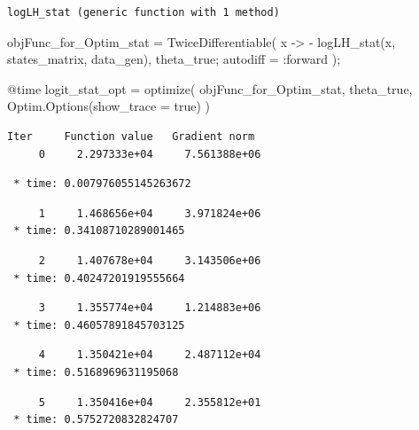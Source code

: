 \documentclass[
  letterpaper,
  DIV=11,
  numbers=noendperiod]{scrreprt}
\newenvironment{Shaded}{\begin{snugshade}}{\end{snugshade}}
\newcommand{\ConstantTok}[1]{\textcolor[rgb]{0.56,0.35,0.01}{#1}}
\newcommand{\FunctionTok}[1]{\textcolor[rgb]{0.28,0.35,0.67}{#1}}
\newcommand{\NormalTok}[1]{\textcolor[rgb]{0.00,0.23,0.31}{#1}}
\newcommand{\OperatorTok}[1]{\textcolor[rgb]{0.37,0.37,0.37}{#1}}
\newcommand{\PreprocessorTok}[1]{\textcolor[rgb]{0.68,0.00,0.00}{#1}}
\begin{document}
\begin{verbatim}
logLH_stat (generic function with 1 method)
\end{verbatim}

\begin{Shaded}
\begin{Highlighting}[]
\NormalTok{objFunc\_for\_Optim\_stat }\OperatorTok{=} \FunctionTok{TwiceDifferentiable}\NormalTok{(}
\NormalTok{    x }\OperatorTok{{-}\textgreater{}} \OperatorTok{{-}} \FunctionTok{logLH\_stat}\NormalTok{(x, states\_matrix, data\_gen),}
\NormalTok{    theta\_true;}
\NormalTok{    autodiff }\OperatorTok{=} \OperatorTok{:}\NormalTok{forward}
\NormalTok{    );}

\PreprocessorTok{@time}\NormalTok{ logit\_stat\_opt }\OperatorTok{=} \FunctionTok{optimize}\NormalTok{(}
\NormalTok{    objFunc\_for\_Optim\_stat,}
\NormalTok{    theta\_true,}
\NormalTok{    Optim.}\FunctionTok{Options}\NormalTok{(show\_trace }\OperatorTok{=} \ConstantTok{true}\NormalTok{)}
\NormalTok{)}
\end{Highlighting}
\end{Shaded}

\begin{verbatim}
Iter     Function value   Gradient norm 
     0     2.297333e+04     7.561388e+06
\end{verbatim}

\begin{verbatim}
 * time: 0.007976055145263672
\end{verbatim}

\begin{verbatim}
     1     1.468656e+04     3.971824e+06
 * time: 0.34108710289001465
\end{verbatim}

\begin{verbatim}
     2     1.407678e+04     3.143506e+06
 * time: 0.40247201919555664
\end{verbatim}

\begin{verbatim}
     3     1.355774e+04     1.214883e+06
 * time: 0.46057891845703125
\end{verbatim}

\begin{verbatim}
     4     1.350421e+04     2.487112e+04
 * time: 0.5168969631195068
\end{verbatim}

\begin{verbatim}
     5     1.350416e+04     2.355812e+01
 * time: 0.5752720832824707
\end{verbatim}
\end{document}
